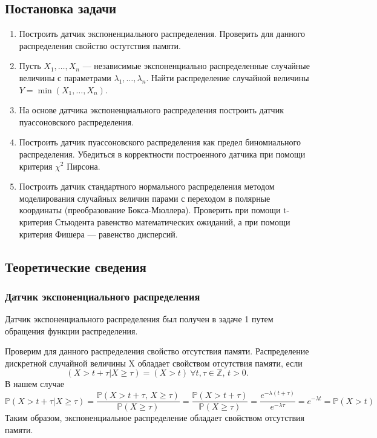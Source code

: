 \documentclass{article}
\renewcommand{\ge}{\geqslant}
\theoremstyle{definition}
\begin{document}
\subsection{Постановка задачи}
\begin{enumerate}
    \item Построить датчик экспоненциального распределения. Проверить для данного
распределения свойство остутствия памяти.
\item Пусть \(X_1, \dots, X_n\) --- независимые экспоненциально распределенные случайные
величины с параметрами \(\lambda_1,\dots,\lambda_n\). Найти распределение случайной величины
\(Y = \min(X_1,\dots,X_n)\).
\item На основе датчика экспоненциального распределения построить датчик пуассоновского распределения.
\item Построить датчик пуассоновского распределения как предел биномиального распределения. Убедиться в корректности построенного датчика при помощи критерия \(\chi^2\) Пирсона.
\item Построить датчик стандартного нормального распределения методом моделирования случайных величин парами с переходом в полярные координаты (преобразование Бокса-Мюллера). Проверить при помощи t-критерия Стьюдента равенство математических ожиданий, а при помощи критерия Фишера — равенство
дисперсий.

\end{enumerate}

\subsection{Теоретические сведения}

\subsubsection{Датчик экспоненциального распределения}

Датчик экспоненциального распределения был получен в задаче 1 путем обращения функции распределения.

Проверим для данного распределения свойство отсутствия памяти. Распределение дискретной случайной величины X обладает свойством отсутствия памяти, если $$(X > t + \tau |X \ge \tau) = (X > t)\ \forall t, \tau \in \mathbb{Z},\, t > 0.$$
В нашем случае
$$\mathbb{P}(X > t + \tau |X \ge \tau) = \frac{\mathbb{P}(X > t + \tau,\, X \ge \tau)}{\mathbb{P}(X \ge \tau)} = \frac{\mathbb{P}(X > t + \tau)}{\mathbb{P}(X \ge \tau)} = \frac{e^{-\lambda(t + \tau)}}{e^{-\lambda \tau}} = e^{-\lambda t} = \mathbb{P}(X > t)$$
Таким образом, экспоненциальное распределение обладает свойством отсутствия памяти.
\end{document}
